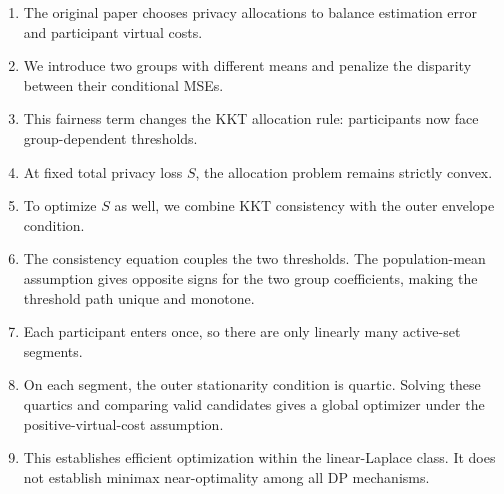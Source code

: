 \documentclass[11pt,a4paper]{article}
\newcommand{\1}{\mathbf{1}}
\begin{document}
\begin{enumerate}
  \item The original paper chooses privacy allocations to balance
        estimation error and participant virtual costs.
  \item We introduce two groups with different means and penalize the
        disparity between their conditional MSEs.
  \item This fairness term changes the KKT allocation rule: participants
        now face group-dependent thresholds.
  \item At fixed total privacy loss \(S\), the allocation problem remains
        strictly convex.
  \item To optimize \(S\) as well, we combine KKT consistency with the
        outer envelope condition.
  \item The consistency equation couples the two thresholds. The
        population-mean assumption gives opposite signs for the two
        group coefficients, making the threshold path unique and
        monotone.
  \item Each participant enters once, so there are only linearly many
        active-set segments.
  \item On each segment, the outer stationarity condition is quartic.
        Solving these quartics and comparing valid candidates gives a
        global optimizer under the positive-virtual-cost assumption.
  \item This establishes efficient optimization within the
        linear-Laplace class. It does not establish minimax
        near-optimality among all DP mechanisms.
\end{enumerate}
\end{document}
